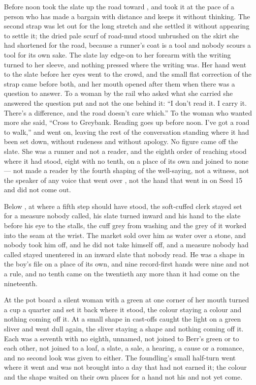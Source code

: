 Before noon  took the slate up the road toward , and took it at the pace of a person who has made a bargain with distance and keeps it without thinking. The second strap was let out for the long stretch and she settled it without appearing to settle it; the dried pale scurf of road-mud stood unbrushed on the skirt she had shortened for the road, because a runner's coat is a tool and nobody scours a tool for its own sake. The slate lay edge-on to her forearm with the writing turned to her sleeve, and nothing pressed where the writing was. Her hand went to the slate before her eyes went to the crowd, and the small flat correction of the strap came before both, and her mouth opened after them when there was a question to answer. To a woman by the rail who asked what she carried she answered the question put and not the one behind it: “I don't read it. I carry it. There's a difference, and the road doesn't care which.” To the woman who wanted more she said, “Cross to Greybank. Reading goes up before noon. I've got a road to walk,” and went on, leaving the rest of the conversation standing where it had been set down, without rudeness and without apology. No figure came off the slate. She was a runner and not a reader, and the eighth order of reaching stood where it had stood, eight with no tenth, on a place of its own and joined to none --- not made a reader by the fourth shaping of the well-saying, not a witness, not the speaker of any voice that went over , not the hand that went in on Seed 15 and did not come out.

Below , at  where a fifth step should have stood, the soft-cuffed clerk stayed set for a measure nobody called, his slate turned inward and his hand to the slate before his eye to the stalls, the cuff grey from washing and the grey of it worked into the seam at the wrist. The market sold over him as water over a stone, and nobody took him off, and he did not take himself off, and a measure nobody had called stayed unentered in an inward slate that nobody read. He was a shape in the boy's file on a place of its own, and nine record-first hands were nine and not a rule, and no tenth came on the twentieth any more than it had come on the nineteenth.

At the pot board a silent woman with a green at one corner of her mouth turned a cup a quarter and set it back where it stood, the colour staying a colour and nothing coming off it. At  a small shape in cast-offs caught the light on a green sliver and went dull again, the sliver staying a shape and nothing coming off it. Each was a seventh with no eighth, unnamed, not joined to Berr's green or to each other, not joined to a loaf, a slate, a sale, a hearing, a cause or a romance, and no second look was given to either. The foundling's small half-turn went where it went and was not brought into a day that had not earned it; the colour and the shape waited on their own places for a hand not his and not yet come.

